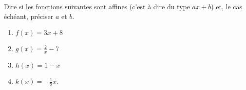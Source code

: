 
\begin{exercice}\label{exosmath-0409}

    Dire si les fonctions suivantes sont affines (c'est à dire du type \( ax+b\)) et, le cas échéant, préciser \( a\) et \( b\).
    \begin{multicols}{3}
        \begin{enumerate}
            \item
                \( f(x)=3x+8\)
            \item
                \( g(x)=\frac{ 2 }{ x }-7\)
            \item
                \( h(x)=1-x\)
            \item
                \( k(x)=-\frac{ 1 }{2}x\).
        \end{enumerate}
    \end{multicols}

\end{exercice}
